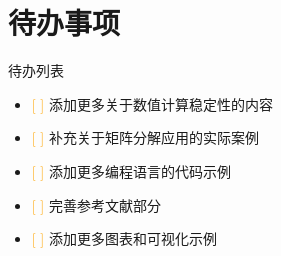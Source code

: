 \section{待办事项}

\begin{genbox}{待办列表}
\begin{itemize}
    \item \textcolor{orange}{[ ]} 添加更多关于数值计算稳定性的内容
    \item \textcolor{orange}{[ ]} 补充关于矩阵分解应用的实际案例
    \item \textcolor{orange}{[ ]} 添加更多编程语言的代码示例
    \item \textcolor{orange}{[ ]} 完善参考文献部分
    \item \textcolor{orange}{[ ]} 添加更多图表和可视化示例
\end{itemize}
\end{genbox}